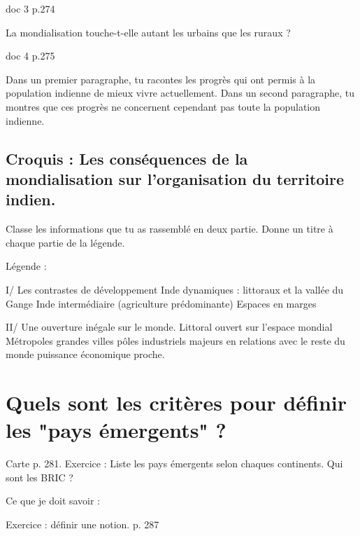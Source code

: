 \documentclass{beamer}
\begin{document}
\begin{frame}
doc 3 p.274
\end{frame}

\begin{frame}
La mondialisation touche-t-elle autant les urbains que les ruraux ?
\end{frame}

\begin{frame}
doc 4 p.275
\end{frame}

\begin{frame}
Dans un premier paragraphe, tu racontes les progrès qui ont permis à la population indienne de mieux vivre actuellement. Dans un second paragraphe, tu montres que ces progrès ne concernent cependant pas toute la population indienne.
\end{frame}

\subsection{Croquis : Les conséquences de la mondialisation sur l'organisation du territoire indien.}
\begin{frame}
Classe les informations que tu as rassemblé en deux partie. Donne un titre à chaque partie de la légende.

Légende : 

I/ Les contrastes de développement
Inde dynamiques : littoraux et la vallée du Gange
Inde intermédiaire (agriculture prédominante)
Espaces en marges


II/ Une ouverture inégale sur le monde.
Littoral ouvert sur l'espace mondial
Métropoles
grandes villes
pôles industriels majeurs en relations avec le reste du monde
puissance économique proche.



\end{frame}

\section{Quels sont les critères pour définir les "pays émergents" ? }

Carte p. 281.
Exercice : 
Liste les pays émergents selon chaques continents.
Qui sont les BRIC ?

Ce que je doit savoir : %

Exercice : définir une notion. p. 287
\end{document}
